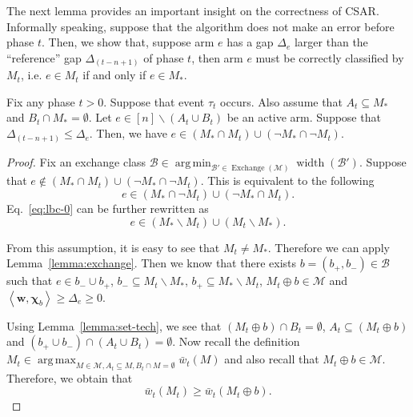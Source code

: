 \documentclass{article}
\newcommand{\AlgorithmBud}{{\small \textsf{CSAR}}\xspace}
\newcommand{\M}{\mathcal M}
\newcommand{\B}{\mathcal B}
\newcommand{\del}{\backslash}
\DeclareMathOperator{\rank}{width}
\DeclareMathOperator*{\argmax}{arg\,max}
\DeclareMathOperator*{\argmin}{arg\,min}
\DeclareMathOperator{\Exchange}{Exchange}
\newcommand{\inn}[1]{\left\langle #1 \right\rangle}
\renewcommand{\vec}[1]{\boldsymbol{#1}}
\begin{document}
The next lemma provides an important insight on the correctness of \AlgorithmBud.
Informally speaking, suppose that the algorithm does not make an error before phase $t$.
Then, we show that, suppose arm $e$ has a gap $\Delta_e$ larger than the ``reference'' gap $\Delta_{(t-n+1)}$ of phase $t$, then arm $e$ must be correctly classified by $M_t$, i.e. $e\in M_t$ if and only if $e\in M_*$.
\begin{lemma}
Fix any phase $t>0$. 
Suppose that event $\tau_t$ occurs. 
Also assume that $A_t \subseteq M_*$ and $B_t \cap M_* = \emptyset$.
Let $e\in [n] \del (A_t \cup B_t)$ be an active arm.
Suppose that $\Delta_{(t-n+1)} \le \Delta_e$.
Then, we have $e\in (M_* \cap M_t) \cup ( \neg M_* \cap \neg M_t)$.
\label{lemma:budget:correct}
\end{lemma}

\begin{proof}

Fix an exchange class $\B\in \argmin_{\B'\in \Exchange(\M)} \rank(\B')$.
Suppose that $e\not\in (M_* \cap M_t) \cup ( \neg M_* \cap \neg M_t)$. 
This is equivalent to the following 
\begin{equation}
\label{eq:lbc-0}
e\in (M_* \cap \neg M_t) \cup (\neg M_* \cap M_t).
\end{equation}
Eq.~\eqref{eq:lbc-0} can be further rewritten as 
$$
e\in (M_* \del M_t) \cup (M_t \del M_*).
$$

From this assumption, it is easy to see that $M_t \not= M_*$.
Therefore we can apply Lemma~\ref{lemma:exchange}.
Then we know that there exists $b=(b_+,b_-)\in \B$ such that 
$e\in b_- \cup b_+$, $b_-\subseteq M_t \del M_*$, $b_+\subseteq M_* \del M_t$, $M_t\oplus b \in \M$ and $\inn{\vec w, \vec \chi_b} \ge \Delta_e \ge 0$.

Using Lemma~\ref{lemma:set-tech}, we see that
$(M_t \oplus b) \cap B_t = \emptyset$, $A_t \subseteq (M_t \oplus b)$ and $(b_+\cup b_-) \cap (A_t \cup B_t) = \emptyset$.
Now recall the definition $M_t \in \argmax_{M\in \M, A_t\subseteq M, B_t \cap M = \emptyset} \bar w_t(M)$ and also recall that $M_t \oplus b \in \M$.
Therefore, we obtain that 
\begin{equation}
\label{eq:lbc-1}
\bar w_t(M_t) \ge \bar w_t(M_t \oplus b).
\end{equation}


\end{proof}
\end{document}
